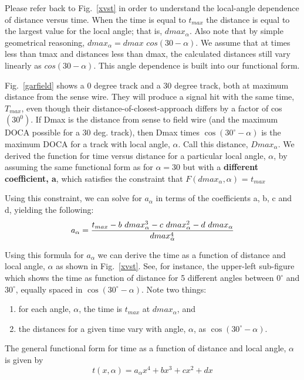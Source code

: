 Please refer back to Fig.~\ref{xvst} in order to understand the local-angle dependence
of distance versus time.  When the time is equal to $t_{max}$ the distance is equal to
the largest value for the local angle; that is, $dmax_{\alpha}$.  Also note that by
simple geometrical reasoning, $dmax_{\alpha} = dmax$  $cos(30-\alpha)$.
We assume that at times less than tmax and distances less than dmax, the calculated
distances still vary linearly as $cos(30-\alpha)$.  This angle dependence is built into
our functional form.


Fig.~\ref{garfield} shows a 0 degree track and a 30 degree
track, both at maximum distance from the sense wire.  They will produce
a signal hit with the same time, $T_{max}$, even though their distance-of-closest-approach 
differs by a factor
of cos$(30^{0})$.  If Dmax is the distance from sense to field wire (and the maximum
DOCA possible for a 30 deg. track), then Dmax times $\cos(30^\circ-\alpha)$ is the maximum
DOCA for a track with local angle, $\alpha$.  Call this distance, $Dmax_{\alpha}$.  
We derived the function for time 
versus distance for a particular local angle, $\alpha$, by
assuming the same functional form as for $\alpha = 30$ but 
with a {\bf different coefficient, a}, which 
satisfies the constraint that  $F(dmax_{\alpha},\alpha)$ = $t_{max}$

Using this constraint, we can solve for $a_{\alpha}$ in terms of the coefficients a, b, c and d,
yielding the following:
\begin{equation}
\label{aalphaequation}
a_{\alpha} = {{t_{max} - b ~dmax_{\alpha}^3 - c ~dmax_{\alpha}^2 - d ~dmax_{\alpha}}\over{dmax_{\alpha}^4}}
\end{equation}

Using this formula for $a_{\alpha}$ we can derive the time as a function of distance and local
angle, $\alpha$ as shown in Fig.~\ref{xvst}.  See, for instance, the upper-left sub-figure 
which shows the time as function of distance for 5 different angles between $0^{\circ}$ and 
$30^{\circ}$, equally spaced in $\cos \left(30^\circ-\alpha\right)$.  Note two things:
\begin{enumerate}
\item for each angle, $\alpha$, the time is $t_{max}$ at $dmax_{\alpha}$, and
\item the distances for a given time vary with angle, $\alpha$, as $\cos \left(30^\circ-\alpha\right)$.
\end{enumerate}

The general functional form for time as a function of distance and local angle, $\alpha$
is given by
\begin{equation}
\label{tfunctionofxandlocalangle}
t(x,\alpha) = a_{\alpha} x^4 + b x^3 + c x^2 + d x
\end{equation}

